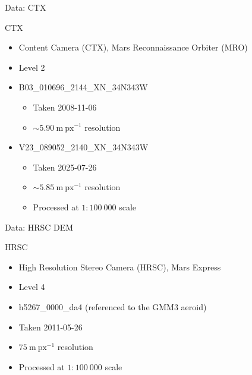 \begin{frame}{Data: CTX}
    \begin{block}{CTX}
        \begin{itemize}
            \item Content Camera (CTX), Mars Reconnaissance Orbiter (MRO)
            \item Level 2
            \item B03\_010696\_2144\_XN\_34N343W
            \begin{itemize}
                \item Taken 2008-11-06 
                \item $\sim 5.90\ \mathrm{m\ px^{-1}}$ resolution
            \end{itemize}
            \item V23\_089052\_2140\_XN\_34N343W
            \begin{itemize}
                \item Taken 2025-07-26 
                \item $\sim 5.85\ \mathrm{m\ px^{-1}}$ resolution
                \item Processed at $1:100\ 000$ scale
            \end{itemize}
        \end{itemize}
    \end{block}
\end{frame}

\begin{frame}{Data: HRSC DEM}
    \begin{block}{HRSC}
        \begin{itemize}
            \item High Resolution Stereo Camera (HRSC), Mars Express
            \item Level 4
            \item h5267\_0000\_da4 (referenced to the GMM3 aeroid)
            \item Taken 2011-05-26
            \item $75\ \mathrm{m\ px^{-1}}$ resolution
            \item Processed at $1:100\ 000$ scale
        \end{itemize}
    \end{block}
\end{frame}

